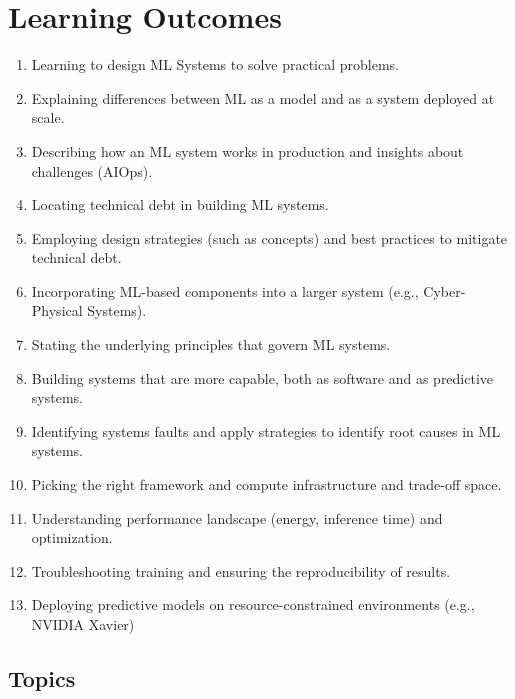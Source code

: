 \documentclass[11pt]{article}
\begin{document}
\newpage

\section*{Learning Outcomes}
\begin{enumerate}
\item Learning to design ML Systems to solve practical problems.
\item Explaining differences between ML as a model and as a system deployed at scale.
\item Describing how an ML system works in production and insights about challenges (AIOps).
\item Locating technical debt in building ML systems.
\item Employing design strategies (such as concepts) and best practices to mitigate technical debt.
\item Incorporating ML-based components into a larger system (e.g., Cyber-Physical Systems).
\item Stating the underlying principles that govern ML systems.
\item Building systems that are more capable, both as software and as predictive systems.
\item Identifying systems faults and apply strategies to identify root causes in ML systems.
\item Picking the right framework and compute infrastructure and trade-off space.
\item Understanding performance landscape (energy, inference time) and optimization.
\item Troubleshooting training and ensuring the reproducibility of results.
\item Deploying predictive models on resource-constrained environments (e.g., NVIDIA Xavier)

\end{enumerate}

\subsection*{Topics}
\end{document}

